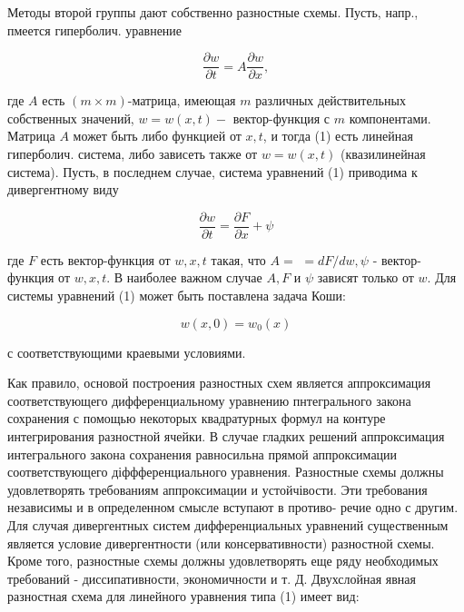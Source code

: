 \documentclass[10pt]{article}
\begin{document}
Методы второй группы дают собственно разностные схемы. Пусть, напр., пмеется гиперболич. уравнение



\[

\frac{\partial w}{\partial t}=A \frac{\partial w}{\partial x},

\]



где $A$ есть $(m \times m)$-матрица, имеющая $m$ различных действительных собственных значений, $w=w(x, t)-$ вектор-функция с $m$ компонентами. Матрица $A$ может быть либо функцией от $x, t$, и тогда (1) есть линейная гиперболич. система, либо зависеть также от $w=w(x, t)$ (квазилинейная система). Пусть, в последнем случае, система уравнений (1) приводима к дивергентному виду



\[

\frac{\partial w}{\partial t}=\frac{\partial F}{\partial x}+\psi

\]



где $F$ есть вектор-функция от $w, x, t$ такая, что $A=$ $=d F / d w, \psi$ - вектор-функция от $w, x, t$. В наиболее важном случае $A, F$ и $\psi$ зависят только от $w$. Для системы уравнений (1) может быть поставлена задача Коши:



\[

w(x, 0)=w_{0}(x)

\]



с соответствующими краевыми условиями.



Как правило, основой построения разностных схем является аппроксимация соответствующего дифференциальному уравнению пнтегрального закона сохранения с помощью некоторых квадратурных формул на контуре интегрирования разностной ячейки. В случае гладких решений аппроксимация интегрального закона сохранения равносильна прямой аппроксимации соответствующего діффференциального уравнения. Разностные схемы должны удовлетворять требованиям аппроксимации и устойчівости. Эти требования независимы и в определенном смысле вступают в противо- речие одно с другим. Для случая дивергентных систем дифференциальных уравнений существенным является условие дивергентности (или консервативности) разностной схемы. Кроме того, разностные схемы должны удовлетворять еще ряду необходимых требований - диссипативности, экономичности и т. Д. Двухслойная явная разностная схема для линейного уравнения типа (1) имеет вид:
\end{document}
